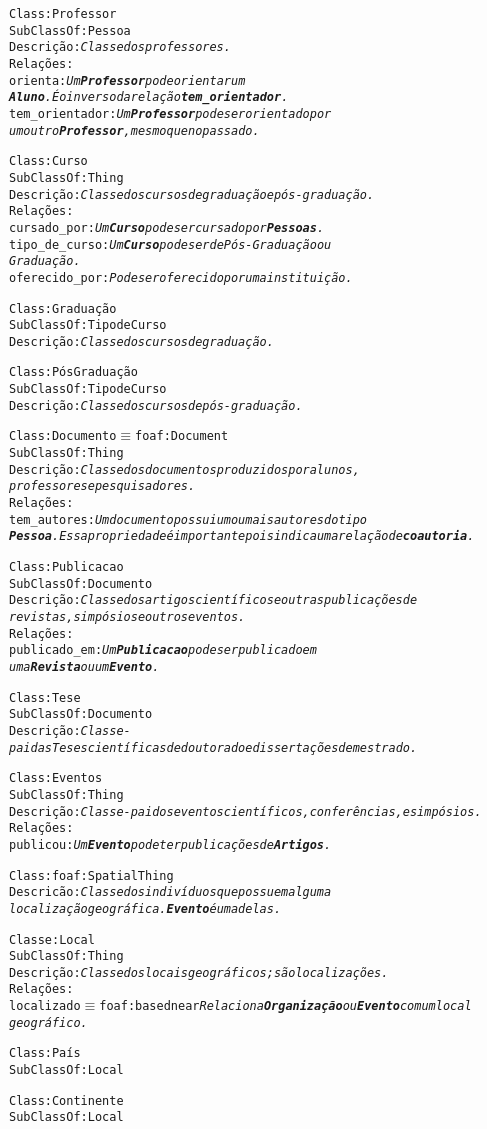\begin{alltt}
Class: Professor
SubClassOf: Pessoa
Descrição: \emph{Classe dos professores.}
Relações:
  orienta: \emph{Um \textbf{Professor} pode orientar um
\textbf{Aluno}. É o inverso da relação \textbf{tem_orientador}.}
  tem_orientador: \emph{Um \textbf{Professor} pode ser orientado por
um outro \textbf{Professor}, mesmo que no passado.}

Class: Curso
SubClassOf: Thing
Descrição: \emph{Classe dos cursos de graduação e pós-graduação.}
Relações:
  cursado_por: \emph{Um \textbf{Curso} pode ser cursado por \textbf{Pessoas}.}
  tipo_de_curso: \emph{Um \textbf{Curso} pode ser de Pós-Graduação ou
Graduação.}
  oferecido_por: \emph{Pode ser oferecido por uma instituição.}

Class: Graduação
SubClassOf: Tipo de Curso
Descrição: \emph{Classe dos cursos de graduação.}

Class: Pós Graduação
SubClassOf: Tipo de Curso
Descrição: \emph{Classe dos cursos de pós-graduação.}

Class: Documento \( \equiv \) foaf:Document
SubClassOf: Thing
Descrição: \emph{Classe dos documentos produzidos por alunos,
professores e pesquisadores.}
Relações:
  tem_autores: \emph{Um documento possui um ou mais autores do tipo
\textbf{Pessoa}. Essa propriedade é importante pois indica uma relação de \textbf{coautoria}.}

Class: Publicacao
SubClassOf: Documento
Descrição: \emph{Classe dos artigos científicos e outras publicações de
revistas, simpósios e outros eventos.}
Relações:
  publicado_em: \emph{Um \textbf{Publicacao} pode ser publicado em
uma \textbf{Revista} ou um \textbf{Evento}.}

Class: Tese
SubClassOf: Documento
Descrição: \emph{Classe-pai das Teses científicas de doutorado e dissertações de mestrado.}

Class: Eventos
SubClassOf: Thing
Descrição: \emph{Classe-pai dos eventos científicos, conferências, e simpósios.}
Relações:
  publicou: \emph{Um \textbf{Evento} pode ter publicações de \textbf{Artigos}.}

Class: foaf:Spatial Thing
Descricão: \emph{Classe dos indivíduos que possuem alguma
localização geográfica. \textbf{Evento} é uma delas.}

Classe: Local
SubClassOf: Thing
Descrição: \emph{Classe dos locais geográficos; são localizações.}
Relações:
  localizado \( \equiv \) foaf:based near \emph{Relaciona \textbf{Organização} ou \textbf{Evento} com um local
geográfico.}

Class: País
SubClassOf: Local

Class: Continente
SubClassOf: Local

\end{alltt}


